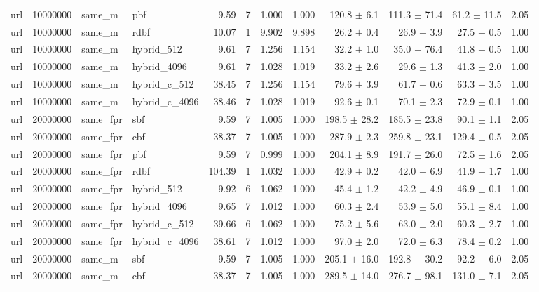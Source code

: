 \begin{tabular}{llllrrrrrrrr}
url & 10000000 & same\_m & pbf & 9.59 & 7 & 1.000 & 1.000 & 120.8 $\pm$ 6.1 & 111.3 $\pm$ 71.4 & 61.2 $\pm$ 11.5 & 2.05 \\
url & 10000000 & same\_m & rdbf & 10.07 & 1 & 9.902 & 9.898 & 26.2 $\pm$ 0.4 & 26.9 $\pm$ 3.9 & 27.5 $\pm$ 0.5 & 1.00 \\
url & 10000000 & same\_m & hybrid\_512 & 9.61 & 7 & 1.256 & 1.154 & 32.2 $\pm$ 1.0 & 35.0 $\pm$ 76.4 & 41.8 $\pm$ 0.5 & 1.00 \\
url & 10000000 & same\_m & hybrid\_4096 & 9.61 & 7 & 1.028 & 1.019 & 33.2 $\pm$ 2.6 & 29.6 $\pm$ 1.3 & 41.3 $\pm$ 2.0 & 1.00 \\
url & 10000000 & same\_m & hybrid\_c\_512 & 38.45 & 7 & 1.256 & 1.154 & 79.6 $\pm$ 3.9 & 61.7 $\pm$ 0.6 & 63.3 $\pm$ 3.5 & 1.00 \\
url & 10000000 & same\_m & hybrid\_c\_4096 & 38.46 & 7 & 1.028 & 1.019 & 92.6 $\pm$ 0.1 & 70.1 $\pm$ 2.3 & 72.9 $\pm$ 0.1 & 1.00 \\
url & 20000000 & same\_fpr & sbf & 9.59 & 7 & 1.005 & 1.000 & 198.5 $\pm$ 28.2 & 185.5 $\pm$ 23.8 & 90.1 $\pm$ 1.1 & 2.05 \\
url & 20000000 & same\_fpr & cbf & 38.37 & 7 & 1.005 & 1.000 & 287.9 $\pm$ 2.3 & 259.8 $\pm$ 23.1 & 129.4 $\pm$ 0.5 & 2.05 \\
url & 20000000 & same\_fpr & pbf & 9.59 & 7 & 0.999 & 1.000 & 204.1 $\pm$ 8.9 & 191.7 $\pm$ 26.0 & 72.5 $\pm$ 1.6 & 2.05 \\
url & 20000000 & same\_fpr & rdbf & 104.39 & 1 & 1.032 & 1.000 & 42.9 $\pm$ 0.2 & 42.0 $\pm$ 6.9 & 41.9 $\pm$ 1.7 & 1.00 \\
url & 20000000 & same\_fpr & hybrid\_512 & 9.92 & 6 & 1.062 & 1.000 & 45.4 $\pm$ 1.2 & 42.2 $\pm$ 4.9 & 46.9 $\pm$ 0.1 & 1.00 \\
url & 20000000 & same\_fpr & hybrid\_4096 & 9.65 & 7 & 1.012 & 1.000 & 60.3 $\pm$ 2.4 & 53.9 $\pm$ 5.0 & 55.1 $\pm$ 8.4 & 1.00 \\
url & 20000000 & same\_fpr & hybrid\_c\_512 & 39.66 & 6 & 1.062 & 1.000 & 75.2 $\pm$ 5.6 & 63.0 $\pm$ 2.0 & 60.3 $\pm$ 2.7 & 1.00 \\
url & 20000000 & same\_fpr & hybrid\_c\_4096 & 38.61 & 7 & 1.012 & 1.000 & 97.0 $\pm$ 2.0 & 72.0 $\pm$ 6.3 & 78.4 $\pm$ 0.2 & 1.00 \\
url & 20000000 & same\_m & sbf & 9.59 & 7 & 1.005 & 1.000 & 205.1 $\pm$ 16.0 & 192.8 $\pm$ 30.2 & 92.2 $\pm$ 6.0 & 2.05 \\
url & 20000000 & same\_m & cbf & 38.37 & 7 & 1.005 & 1.000 & 289.5 $\pm$ 14.0 & 276.7 $\pm$ 98.1 & 131.0 $\pm$ 7.1 & 2.05 \\

\end{tabular}
